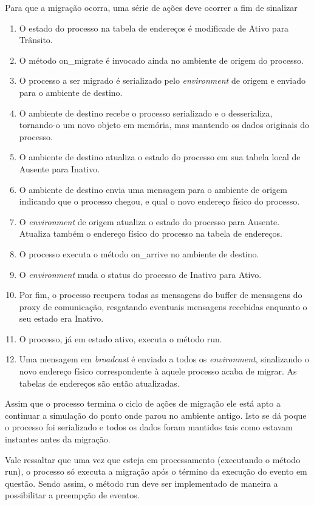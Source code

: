 Para que a migração ocorra, uma série de ações deve ocorrer a fim de sinalizar 

\begin{enumerate}
\item O estado do processo na tabela de endereços é modificade de Ativo para Trânsito.
\item O método on\_migrate é invocado ainda no ambiente de origem do processo.
\item O processo a ser migrado é serializado pelo \textit{environment} de origem e enviado para o ambiente de destino.
\item O ambiente de destino recebe o processo serializado e o desserializa, tornando-o um novo objeto em memória, mas mantendo os dados originais do processo.
\item O ambiente de destino atualiza o estado do processo em sua tabela local de Ausente para Inativo.
\item O ambiente de destino envia uma mensagem para o ambiente de origem indicando que o processo chegou, e qual o novo endereço físico do processo.
\item O \textit{environment} de origem atualiza o estado do processo para Ausente. Atualiza também o endereço físico do processo na tabela de endereços.
\item O processo executa o método on\_arrive no ambiente de destino.
\item O \textit{environment} muda o status do processo de Inativo para Ativo.
\item Por fim, o processo recupera todas as mensagens do buffer de mensagens do proxy de comunicação, resgatando eventuais mensagens recebidas enquanto o seu estado era Inativo.
\item O processo, já em estado ativo, executa o método run.
\item Uma mensagem em \textit{broadcast} é enviado a todos os \textit{environment}, sinalizando o novo endereço físico correspondente à aquele processo acaba de migrar. As tabelas de endereços são então atualizadas.
\end{enumerate}

Assim que o processo termina o ciclo de ações de migração ele está apto a continuar a simulação do ponto onde parou no ambiente antigo. Isto se dá poque o processo foi serializado e todos os dados foram mantidos tais como estavam instantes antes da migração.

Vale ressaltar que uma vez que esteja em processamento (executando o método run), o processo só executa a migração após o término da execução do evento em questão. Sendo assim, o método run deve ser implementado de maneira a possibilitar a preempção de eventos.

